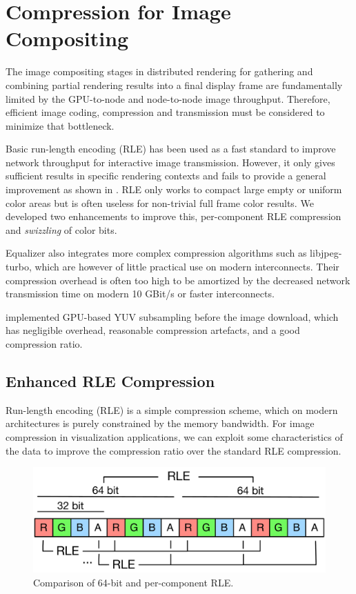 \section{Compression for Image Compositing}

The image compositing stages in distributed rendering for gathering and
combining partial rendering results into a final display frame are fundamentally
limited by the GPU-to-node and node-to-node image throughput. Therefore,
efficient image coding, compression and transmission must be considered to
minimize that bottleneck.

Basic run-length encoding (RLE) has been used as a fast standard to improve
network throughput for interactive image transmission. However, it only gives
sufficient results in specific rendering contexts and fails to provide a general
improvement as shown in \cite{MEP:10}. RLE only works to compact large empty or
uniform color areas but is often useless for non-trivial full frame color
results. We developed two enhancements to improve this, per-component RLE
compression and {\em swizzling} of color bits.

Equalizer also integrates more complex compression algorithms such as
\textsf{libjpeg-turbo}, which are however of little practical use on modern
interconnects. Their compression overhead is often too high to be amortized by
the decreased network transmission time on modern 10 GBit/s or faster
interconnects.

\cite{MEP:10} implemented GPU-based YUV subsampling before the image download,
which has negligible overhead, reasonable compression artefacts, and a good
compression ratio.

\subsection{Enhanced RLE Compression}

Run-length encoding (RLE) is a simple compression scheme, which on modern
architectures is purely constrained by the memory bandwidth. For image
compression in visualization applications, we can exploit some characteristics
of the data to improve the compression ratio over the standard RLE compression.

\begin{figure}
  \includegraphics[width=.618\textwidth]{images/RLE}
  \caption{Comparison of 64-bit and per-component RLE.}
  \label{fRLE}
\end{figure}

